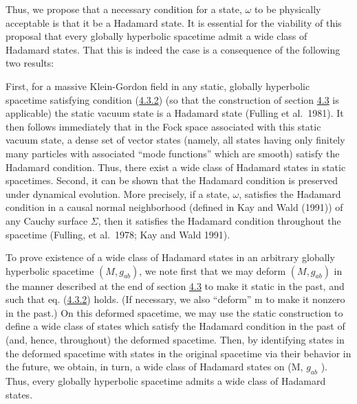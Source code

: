 \documentclass[11pt,a4paper]{article}
\begin{document}
Thus, we propose that a necessary condition for a state, \(\omega\) to be physically acceptable is that it be a Hadamard state. It is essential for the viability of this proposal that every globally hyperbolic spacetime admit a wide class of Hadamard states. That this is indeed the case is a consequence of the following two results:

First, for a massive Klein-Gordon field in any static, globally hyperbolic spacetime satisfying condition (\hyperref[eq:4.3.2]{4.3.2}) (so that the construction of section \hyperlink{sec:4.3}{4.3} is applicable) the static vacuum state is a Hadamard state (Fulling et al.~1981). It then follows immediately that in the Fock space associated with this static vacuum state, a dense set of vector states (namely, all states having only finitely many particles with associated ``mode functions'' which are smooth) satisfy the Hadamard condition. Thus, there exist a wide class of Hadamard states in static spacetimes. Second, it can be shown that the Hadamard condition is preserved under dynamical evolution. More precisely, if a state, \(\omega\), satisfies the Hadamard condition in a causal normal neighborhood (defined in Kay and Wald (1991)) of any Cauchy surface \(\Sigma\), then it satisfies the Hadamard condition throughout the spacetime (Fulling, et al.~1978; Kay and Wald 1991).

To prove existence of a wide class of Hadamard states in an arbitrary globally hyperbolic spacetime \((M, g_{ab})\), we note first that we may deform \((M, g_{ab})\) in the manner described at the end of section \hyperlink{sec:4.3}{4.3} to make it static in the past, and such that eq. (\hyperref[eq:4.3.2]{4.3.2}) holds. (If necessary, we also ``deform'' m to make it nonzero in the past.) On \hypertarget{source-109}{} this deformed spacetime, we may use the static construction to define a wide class of states which satisfy the Hadamard condition in the past of (and, hence, throughout) the deformed spacetime. Then, by identifying states in the deformed spacetime with states in the original spacetime via their behavior in the future, we obtain, in turn, a wide class of Hadamard states on (M, \(g_{ab}\) ). Thus, every globally hyperbolic spacetime admits a wide class of Hadamard states.
\end{document}
